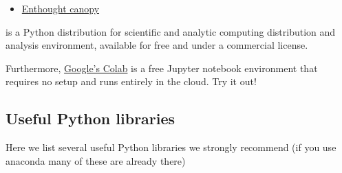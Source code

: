 \documentclass[%
oneside,                 %
final,                   %
10pt]{article}
\begin{document}
\begin{itemize}
\item \href{{https://www.enthought.com/product/canopy/}}{Enthought canopy} 
\end{itemize}

\noindent
is a Python
distribution for scientific and analytic computing distribution and
analysis environment, available for free and under a commercial
license.

Furthermore, \href{{https://colab.research.google.com/notebooks/welcome.ipynb}}{Google's Colab} is a free Jupyter notebook environment that requires 
no setup and runs entirely in the cloud. Try it out!

\subsection{Useful Python libraries}
Here we list several useful Python libraries we strongly recommend (if you use anaconda many of these are already there)
\end{document}
